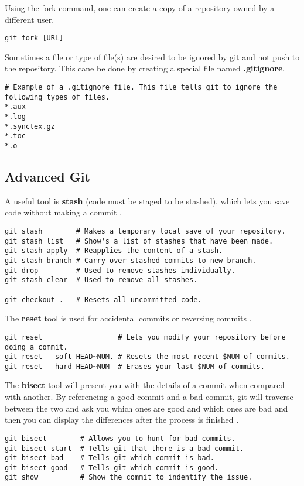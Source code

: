 Using the fork command, one can create a copy of a repository owned by a different user.
\begin{lstlisting}
git fork [URL]
\end{lstlisting}

Sometimes a file or type of file(s) are desired to be ignored by git and not push to the repository. This cane be done by creating a special file named \textbf{.gitignore}.
\begin{lstlisting}
# Example of a .gitignore file. This file tells git to ignore the following types of files.
*.aux
*.log
*.synctex.gz
*.toc
*.o
\end{lstlisting}

\subsection{Advanced Git}

A useful tool is \textbf{stash} (code must be staged to be stashed), which lets you save code without making a commit \cite{git}\cite{git: Advanced}.
\begin{lstlisting}
git stash        # Makes a temporary local save of your repository.
git stash list   # Show's a list of stashes that have been made.
git stash apply  # Reapplies the content of a stash.
git stash branch # Carry over stashed commits to new branch.
git drop         # Used to remove stashes individually.
git stash clear  # Used to remove all stashes.

git checkout .   # Resets all uncommitted code.
\end{lstlisting}

The \textbf{reset} tool is used for accidental commits or reversing commits \cite{git}\cite{git: Advanced}.
\begin{lstlisting}
git reset                  # Lets you modify your repository before doing a commit.
git reset --soft HEAD~NUM. # Resets the most recent $NUM of commits.
git reset --hard HEAD~NUM  # Erases your last $NUM of commits.
\end{lstlisting}

The \textbf{bisect} tool will present you with the details of a commit when compared with another. By referencing a good commit and a bad commit, git will traverse between the two and ask you which ones are good and which ones are bad and then you can display the differences after the process is finished \cite{git}\cite{git: Advanced}.
\begin{lstlisting}
git bisect        # Allows you to hunt for bad commits.
git bisect start  # Tells git that there is a bad commit.
git bisect bad    # Tells git which commit is bad.
git bisect good   # Tells git which commit is good.
git show          # Show the commit to indentify the issue.
\end{lstlisting}

